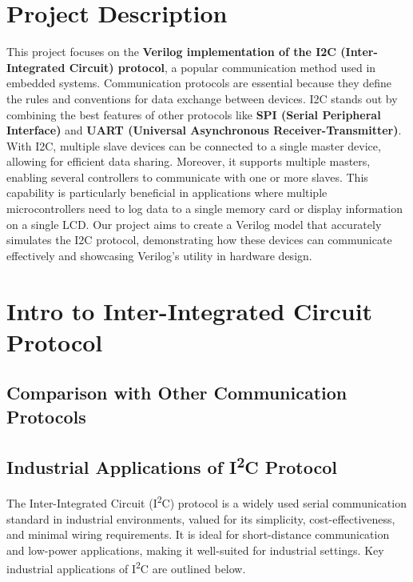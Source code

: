 \documentclass[a4paper,12pt]{report}
\begin{document}
\section{Project Description}
This project focuses on the \textbf{Verilog implementation of the I2C (Inter-Integrated Circuit) protocol}, a popular communication method used in embedded systems. Communication protocols are essential because they define the rules and conventions for data exchange between devices. I2C stands out by combining the best features of other protocols like \textbf{SPI (Serial Peripheral Interface)} and \textbf{UART (Universal Asynchronous Receiver-Transmitter)}. With I2C, multiple slave devices can be connected to a single master device, allowing for efficient data sharing. Moreover, it supports multiple masters, enabling several controllers to communicate with one or more slaves. This capability is particularly beneficial in applications where multiple microcontrollers need to log data to a single memory card or display information on a single LCD. Our project aims to create a Verilog model that accurately simulates the I2C protocol, demonstrating how these devices can communicate effectively and showcasing Verilog's utility in hardware design.

\newpage

\section{Intro to Inter-Integrated Circuit Protocol}
\subsection{Comparison with Other Communication Protocols}
\subsection*{Industrial Applications of I\textsuperscript{2}C Protocol}

The Inter-Integrated Circuit (I\textsuperscript{2}C) protocol is a widely used serial communication standard in industrial environments, valued for its simplicity, cost-effectiveness, and minimal wiring requirements. It is ideal for short-distance communication and low-power applications, making it well-suited for industrial settings. Key industrial applications of I\textsuperscript{2}C are outlined below.
\end{document}
